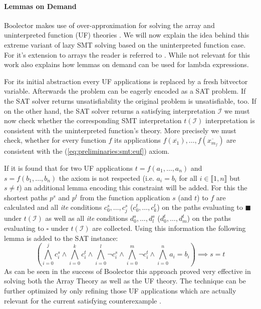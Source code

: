 \paragraph{Lemmas on Demand}
Boolector makes use of over-approximation for solving the array \cite{p6-brummayer} and uninterpreted function (UF) theories \cite{PreinerNiemetzBiere-DIFTS13}. We will now explain the idea behind this extreme variant of lazy SMT solving based on the uninterpreted function case. For it's extension to arrays the reader is referred to \cite{p6-brummayer}. While not relevant for this work \cite{PreinerNiemetzBiere-DIFTS13} also explains how lemmas on demand can be used for lambda expressions. 
\par
For its initial abstraction every UF applications is replaced by a fresh bitvector variable. Afterwards the problem can be eagerly encoded as a SAT problem. If the SAT solver returns unsatisfiability the original problem is unsatisfiable, too. If on the other hand, the SAT solver returns a satisfying interpretation $\mathcal{I}$ we must now check whether the corresponding SMT interpretation $t\left(\mathcal{I}\right)$ interpretation is consistent with the uninterpreted function's theory. More precisely we must check, whether for every function $f$ its applications $f\left(\overline{x_1}\right),\dots,f\left(\overline{x_{m_{f}}}\right)$ are consistent with the (\ref{eq:preliminaries:smt:euf}) axiom.
\par
If it is found that for two UF applications $t=f\left(a_1,\dots,a_n\right)$ and $s=f\left(b_1,\dots,b_n\right)$
the axiom is not respected (i.e. $a_i=b_i$ for all $i\in\llbracket1,n\rrbracket$ but $s\neq t$) an additional lemma encoding this constraint will be added. For this the shortest paths $p^s$ and $p^t$ from the function application $s$ (and $t$) to $f$ are calculated and all \textit{ite} conditions $c_0^s,\dots,c_j^s$ ($c_0^t,\dots,c_k^t$) on the paths evaluating to $\blacksquare$ under $t\left(\mathcal{I}\right)$ as well as all \textit{ite} conditions $d_0^s,\dots,d_l^s$ ($d_0^t,\dots,d_m^t$) on the paths evaluating to $\square$ under $t\left(\mathcal{I}\right)$ are collected. Using this information the following lemma is added to the SAT instance:
\[
\left(\bigwedge\limits_{i=0}^{j}c_i^s \land \bigwedge\limits_{i=0}^{k}c_i^t \land \bigwedge\limits_{i=0}^{l} \neg c_i^s \land \bigwedge\limits_{i=0}^{m} \neg c_i^t \land \bigwedge\limits_{i=0}^{n} a_i=b_i \right) \implies s=t
\]
As can be seen in the success of Boolector this approach proved very effective in solving both the Array Theory as well as the UF theory. The technique can be further optimized by only refining those UF applications which are actually relevant for the current satisfying counterexample \cite{NiemetzPreinerBiere-FMCAD14}.

